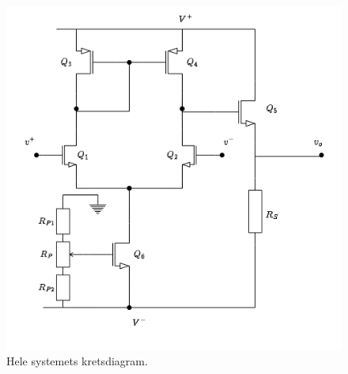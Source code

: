 \begin{figure}[!hbt]
	\centering
	\includegraphics[scale=0.7]{./Images/02Concept/full_kretes.drawio.png}
	\caption{Hele systemets kretsdiagram.}
	\label{fig:kretsdiagram}
\end{figure}